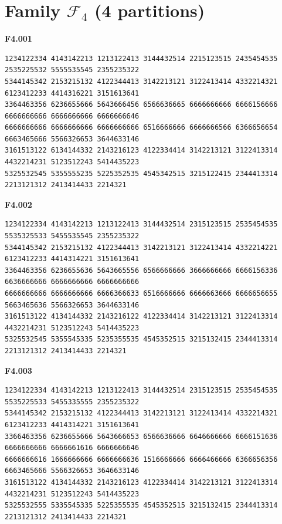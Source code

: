 \section*{\texorpdfstring{Family $\mathcal F_4$ (4 partitions)}{Family F4 (4)}}

\noindent\begin{minipage}{\linewidth}\textbf{F4.001}
\begin{lstlisting}
1234122334 4143142213 1213122413 3144432514 2215123515 2435454535 2535225532 5555535545 2355235322
5344145342 2153215132 4122344413 3142213121 3122413414 4332214321 6123412233 4414316221 3151613641
3364463356 6236655666 5643666456 6566636665 6666666666 6666156666 6666666666 6666666666 6666666646
6666666666 6666666666 6666666666 6516666666 6666666566 6366656654 6663465666 5566326653 3644633146
3161513122 6134144332 2143216123 4122334414 3142213121 3122413314 4432214231 5123512243 5414435223
5325532545 5355555235 5225352535 4545342515 3215122415 2344413314 2213121312 2413414433 2214321
\end{lstlisting}
\end{minipage}\par\smallskip

\noindent\begin{minipage}{\linewidth}\textbf{F4.002}
\begin{lstlisting}
1234122334 4143142213 1213122413 3144432514 2315123515 2535454535 5535325533 5455535545 2355235322
5344145342 2153215132 4122344413 3142213121 3122413414 4332214221 6123412233 4414314221 3151613641
3364463356 6236655636 5643665556 6566666666 3666666666 6666156336 6636666666 6666666666 6666666666
6666666666 6666666666 6666366633 6516666666 6666663666 6666656655 5663465636 5566326653 3644633146
3161513122 4134144332 2143216122 4122334414 3142213121 3122413314 4432214231 5123512243 5414435223
5325532545 5355545335 5235355535 4545352515 3215132415 2344413314 2213121312 2413414433 2214321
\end{lstlisting}
\end{minipage}\par\smallskip

\noindent\begin{minipage}{\linewidth}\textbf{F4.003}
\begin{lstlisting}
1234122334 4143142213 1213122413 3144432514 2315123515 2535454535 5535225533 5455335555 2355235322
5344145342 2153215132 4122344413 3142213121 3122413414 4332214321 6123412233 4414314221 3151613641
3366463356 6236655666 5643666653 6566636666 6646666666 6666151636 6666666666 6666661616 6666666646
6666666616 1666666666 6666666636 1516666666 6666466666 6366656356 6663465666 5566326653 3646633146
3161513122 4134144332 2143216123 4122334414 3142213121 3122413314 4432214231 5123512243 5414435223
5325532555 5335545335 5225355535 4545352515 3215132415 2344413314 2213121312 2413414433 2214321
\end{lstlisting}
\end{minipage}\par\smallskip

